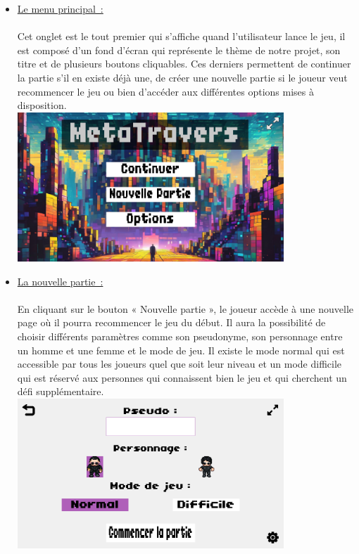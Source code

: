 \documentclass[12pt,a4paper]{article}
\begin{document}
            \begin{itemize}
            
                \item \tabto{1cm} \underline{Le menu principal~:} \\\\
                \tabto{1cm} Cet onglet est le tout premier qui s’affiche quand l’utilisateur lance le jeu, il est composé d’un fond d’écran qui représente le thème de notre projet, son titre et de plusieurs boutons cliquables. Ces derniers permettent de continuer la partie s’il en existe déjà une, de créer une nouvelle partie si le joueur veut recommencer le jeu ou bien d’accéder aux différentes options mises à disposition.\\

                \includegraphics[width=10cm]{images/menu_principal.png}\\
                
                \item \tabto{1cm} \underline{La nouvelle partie~:}\\\\
                \tabto{1cm} En cliquant sur le bouton « Nouvelle partie », le joueur accède à une
                nouvelle page où il pourra recommencer le jeu du début. Il aura la possibilité de choisir différents paramètres comme son pseudonyme, son personnage entre un homme et une femme et le mode de jeu. Il existe le mode normal qui est accessible par tous les joueurs quel que soit leur niveau et un mode difficile qui est réservé aux personnes qui connaissent bien le jeu et qui cherchent un défi supplémentaire.\\

                \includegraphics[width=10cm]{images/nouvelle_partie.png}\\


\end{itemize}
\end{document}
